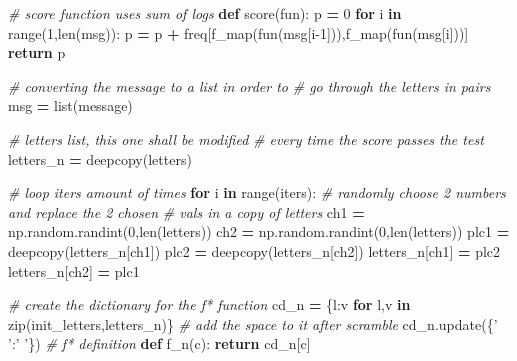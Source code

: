 \documentclass[]{article}
\newenvironment{Shaded}{\begin{snugshade}}{\end{snugshade}}
\newcommand{\BuiltInTok}[1]{#1}
\newcommand{\CommentTok}[1]{\textcolor[rgb]{0.56,0.35,0.01}{\textit{#1}}}
\newcommand{\ControlFlowTok}[1]{\textcolor[rgb]{0.13,0.29,0.53}{\textbf{#1}}}
\newcommand{\DecValTok}[1]{\textcolor[rgb]{0.00,0.00,0.81}{#1}}
\newcommand{\KeywordTok}[1]{\textcolor[rgb]{0.13,0.29,0.53}{\textbf{#1}}}
\newcommand{\NormalTok}[1]{#1}
\newcommand{\OperatorTok}[1]{\textcolor[rgb]{0.81,0.36,0.00}{\textbf{#1}}}
\newcommand{\StringTok}[1]{\textcolor[rgb]{0.31,0.60,0.02}{#1}}
\begin{document}
\begin{Shaded}
\begin{Highlighting}[]
    \CommentTok{# score function uses sum of logs}
    \KeywordTok{def}\NormalTok{ score(fun):}
\NormalTok{        p }\OperatorTok{=} \DecValTok{0}
        \ControlFlowTok{for}\NormalTok{ i }\KeywordTok{in} \BuiltInTok{range}\NormalTok{(}\DecValTok{1}\NormalTok{,}\BuiltInTok{len}\NormalTok{(msg)):}
\NormalTok{            p }\OperatorTok{=}\NormalTok{ p }\OperatorTok{+}\NormalTok{ freq[f_map(fun(msg[i}\DecValTok{-1}\NormalTok{])),f_map(fun(msg[i]))]}
        \ControlFlowTok{return}\NormalTok{ p}
    
    \CommentTok{# converting the message to a list in order to}
    \CommentTok{# go through the letters in pairs}
\NormalTok{    msg }\OperatorTok{=} \BuiltInTok{list}\NormalTok{(message)}

    \CommentTok{# letters list, this one shall be modified}
    \CommentTok{# every time the score passes the test}
\NormalTok{    letters_n }\OperatorTok{=}\NormalTok{ deepcopy(letters)}

    \CommentTok{# loop iters amount of times}
    \ControlFlowTok{for}\NormalTok{ i }\KeywordTok{in} \BuiltInTok{range}\NormalTok{(iters):}
        \CommentTok{# randomly choose 2 numbers and replace the 2 chosen }
        \CommentTok{# vals in a copy of letters}
\NormalTok{        ch1 }\OperatorTok{=}\NormalTok{ np.random.randint(}\DecValTok{0}\NormalTok{,}\BuiltInTok{len}\NormalTok{(letters))}
\NormalTok{        ch2 }\OperatorTok{=}\NormalTok{ np.random.randint(}\DecValTok{0}\NormalTok{,}\BuiltInTok{len}\NormalTok{(letters))}
\NormalTok{        plc1 }\OperatorTok{=}\NormalTok{ deepcopy(letters_n[ch1])}
\NormalTok{        plc2 }\OperatorTok{=}\NormalTok{ deepcopy(letters_n[ch2])}
\NormalTok{        letters_n[ch1] }\OperatorTok{=}\NormalTok{ plc2}
\NormalTok{        letters_n[ch2] }\OperatorTok{=}\NormalTok{ plc1}

        \CommentTok{# create the dictionary for the f* function}
\NormalTok{        cd_n }\OperatorTok{=}\NormalTok{ \{l:v }\ControlFlowTok{for}\NormalTok{ l,v }\KeywordTok{in} \BuiltInTok{zip}\NormalTok{(init_letters,letters_n)\}}
        \CommentTok{# add the space to it after scramble}
\NormalTok{        cd_n.update(\{}\StringTok{' '}\NormalTok{:}\StringTok{' '}\NormalTok{\})}
        \CommentTok{# f* definition}
        \KeywordTok{def}\NormalTok{ f_n(c):}
            \ControlFlowTok{return}\NormalTok{ cd_n[c]}
    

\end{Highlighting}
\end{Shaded}
\end{document}

